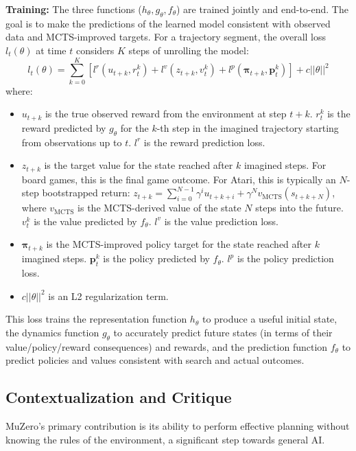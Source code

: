 \documentclass[11pt,a4paper]{article}
\begin{document}
\textbf{Training:}
The three functions ($h_{\theta}, g_{\theta}, f_{\theta}$) are trained jointly and end-to-end. The goal is to make the predictions of the learned model consistent with observed data and MCTS-improved targets. For a trajectory segment, the overall loss $l_t(\theta)$ at time $t$ considers $K$ steps of unrolling the model:
\[ l_t(\theta) = \sum_{k=0}^{K} \left[ l^r(u_{t+k}, r_t^k) + l^v(z_{t+k}, v_t^k) + l^p(\boldsymbol{\pi}_{t+k}, \mathbf{p}_t^k) \right] + c||\theta||^2 \]
where:
\begin{itemize}
    \item $u_{t+k}$ is the true observed reward from the environment at step $t+k$. $r_t^k$ is the reward predicted by $g_{\theta}$ for the $k$-th step in the imagined trajectory starting from observations up to $t$. $l^r$ is the reward prediction loss.
    \item $z_{t+k}$ is the target value for the state reached after $k$ imagined steps. For board games, this is the final game outcome. For Atari, this is typically an $N$-step bootstrapped return: $z_{t+k} = \sum_{i=0}^{N-1} \gamma^i u_{t+k+i} + \gamma^N v_{\text{MCTS}}(s_{t+k+N})$, where $v_{\text{MCTS}}$ is the MCTS-derived value of the state $N$ steps into the future. $v_t^k$ is the value predicted by $f_{\theta}$. $l^v$ is the value prediction loss.
    \item $\boldsymbol{\pi}_{t+k}$ is the MCTS-improved policy target for the state reached after $k$ imagined steps. $\mathbf{p}_t^k$ is the policy predicted by $f_{\theta}$. $l^p$ is the policy prediction loss.
    \item $c||\theta||^2$ is an L2 regularization term.
\end{itemize}
This loss trains the representation function $h_{\theta}$ to produce a useful initial state, the dynamics function $g_{\theta}$ to accurately predict future states (in terms of their value/policy/reward consequences) and rewards, and the prediction function $f_{\theta}$ to predict policies and values consistent with search and actual outcomes.

\subsection{Contextualization and Critique}
MuZero's primary contribution is its ability to perform effective planning without knowing the rules of the environment, a significant step towards general AI.
\end{document}
